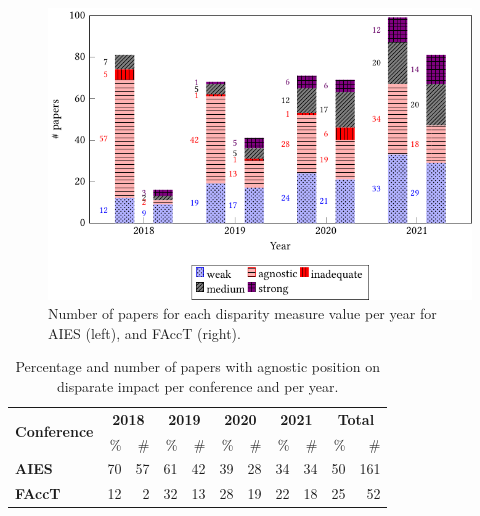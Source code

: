 \documentclass[manuscript]{acmart}
\begin{document}
\begin{figure}[htbp]
    \centering
    \includegraphics[width=\columnwidth]{FAccT-figure2.pdf}
    \caption{Number of papers for each disparity measure value per year for AIES (left), and FAccT (right).}
    \label{fig:disparity}
\end{figure}

\begin{table}[htbp]
    \centering
    \caption{Percentage and number of papers with agnostic position on disparate impact per conference and per year.}
    \begin{tabular}{lrrrrrrrrrr}
        \toprule
        \multirow{2}{*}{\textbf{Conference}} & \multicolumn{2}{c}{\textbf{2018}} & \multicolumn{2}{c}{\textbf{2019}} & \multicolumn{2}{c}{\textbf{2020}} &
        \multicolumn{2}{c}{\textbf{2021}} &
        \multicolumn{2}{c}{\textbf{Total}} \\ 
        \cmidrule(lr){2-3}\cmidrule(lr){4-5}\cmidrule(lr){6-7}\cmidrule(lr){8-9}\cmidrule(lr){10-11}
        & \% & \# & \% & \# & \% & \# & \% & \# & \% & \#\\
        \midrule
        \textbf{AIES} & 70 & 57 & 61 & 42 & 39 & 28 & 34 & 34 & 50 & 161\\
        \textbf{FAccT} & 12 & 2 & 32 & 13 & 28 & 19 & 22 & 18 & 25 & 52\\
        \bottomrule
    \end{tabular}
    \label{tab:agnostic_per_year_per_conf}
\end{table}
\end{document}
